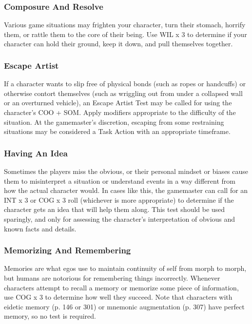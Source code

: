 \subsubsection{Composure And Resolve}

Various game situations may frighten your character, 
turn their stomach, horrify them, or rattle them to the 
core of their being. Use WIL x 3 to determine if your 
character can hold their ground, keep it down, and 
pull themselves together.

\subsubsection{Escape Artist}

If a character wants to slip free of physical bonds (such 
as ropes or handcuffs) or otherwise contort themselves 
(such as wriggling out from under a collapsed wall or 
an overturned vehicle), an Escape Artist Test may be 
called for using the character's COO + SOM. Apply 
modifiers appropriate to the difficulty of the situation. 
At the gamemaster's discretion, escaping from some 
restraining situations may be considered a Task Action 
with an appropriate timeframe.

\subsubsection{Having An Idea}

Sometimes the players miss the obvious, or their personal
mindset or biases cause them to misinterpret a
situation or understand events in a way different from 
how the actual character would. In cases like this, the 
gamemaster can call for an INT x 3 or COG x 3 roll 
(whichever is more appropriate) to determine if the 
character gets an idea that will help them along. This 
test should be used sparingly, and only for assessing 
the character's interpretation of obvious and known 
facts and details.

\subsubsection{Memorizing And Remembering}

Memories are what egos use to maintain continuity of 
self from morph to morph, but humans are notorious 
for remembering things incorrectly. Whenever characters
attempt to recall a memory or memorize some
piece of information, use COG x 3 to determine how 
well they succeed. Note that characters with eidetic 
memory (p. 146 or 301) or mnemonic augmentation 
(p. 307) have perfect memory, so no test is required.

